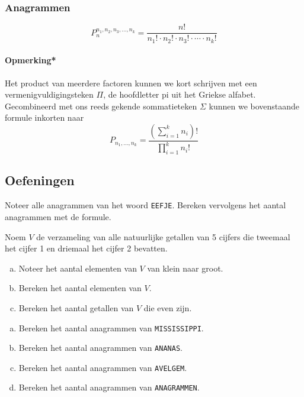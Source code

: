 \documentclass[12pt,a4paper,twoside]{article}
\begin{document}
\subsubsection*{Anagrammen}
\begin{mdframed}
$$P^{n_1,n_2,n_3,\dots,n_k}_n = \dfrac{n!}{n_1!\cdot n_2!\cdot n_3!\cdot \cdots \cdot n_k!}$$
\end{mdframed}

\paragraph*{Opmerking*}
Het product van meerdere factoren kunnen we kort schrijven met een vermenigvuldigingsteken $\Pi$, de hoofdletter pi uit het Griekse alfabet. Gecombineerd met ons reeds gekende sommatieteken $\Sigma$ kunnen we bovenstaande formule inkorten naar
\[P_{n_1,\dots,n_k} = \dfrac{\left(\sum_{i=1}^k n_i\right)!}{\prod_{i=1}^k n_i!}\]

\subsection{Oefeningen}

\vspace*{-0.5cm}
\begin{oefening}
Noteer alle anagrammen van het woord \texttt{EEFJE}. Bereken vervolgens het aantal anagrammen met de formule.
\end{oefening}

\begin{oefening}
Noem $V$ de verzameling van alle natuurlijke getallen van 5 cijfers die tweemaal het cijfer 1 en driemaal het cijfer 2 bevatten.
\begin{enumerate}[(a)]
  \item Noteer het aantal elementen van $V$ van klein naar groot.
  \item Bereken het aantal elementen van $V$.
  \item Bereken het aantal getallen van $V$ die even zijn.
\end{enumerate}
\end{oefening}

\begin{oefening}
  \begin{enumerate}[(a)]
  \item Bereken het aantal anagrammen van \texttt{MISSISSIPPI}.
  \item Bereken het aantal anagrammen van \texttt{ANANAS}.
  \item Bereken het aantal anagrammen van \texttt{AVELGEM}.
  \item Bereken het aantal anagrammen van \texttt{ANAGRAMMEN}.
  \end{enumerate}
\end{oefening}
\end{document}
